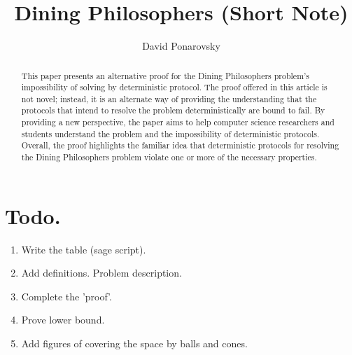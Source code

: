 \documentclass[manuscript,screen,review]{acmart}
\begin{document}


\title{Dining Philosophers (Short Note)} 
\author{David Ponarovsky}

\ifdefined\ACM
\else
  \maketitle
\fi

\begin{abstract} 
This paper presents an alternative proof for the Dining Philosophers problem's impossibility of solving by deterministic protocol. The proof offered in this article is not novel; instead, it is an alternate way of providing the understanding that the protocols that intend to resolve the problem deterministically are bound to fail. By providing a new perspective, the paper aims to help computer science researchers and students understand the problem and the impossibility of deterministic protocols. Overall, the proof highlights the familiar idea that deterministic protocols for resolving the Dining Philosophers problem violate one or more of the necessary properties.
\end{abstract}

%
\ifdefined\ACM
  \maketitle
\fi

% 
%


\newcommand{\Oh}{{\mathcal{O}}}
\newcommand{\bitsize}{N}
\newcommand{\longversion}[1]{#1}
\newcommand{\abpartization}{{\sc Vertex $(r,\ell)$-Partization}}


\section{Todo.}
\begin{enumerate}
  \item Write the table (sage script). 
  \item Add definitions. Problem description.  
  \item Complete the 'proof'. 
  \item Prove lower bound. 
  \item Add figures of covering the space by balls and cones. 
\end{enumerate}
\end{document}
